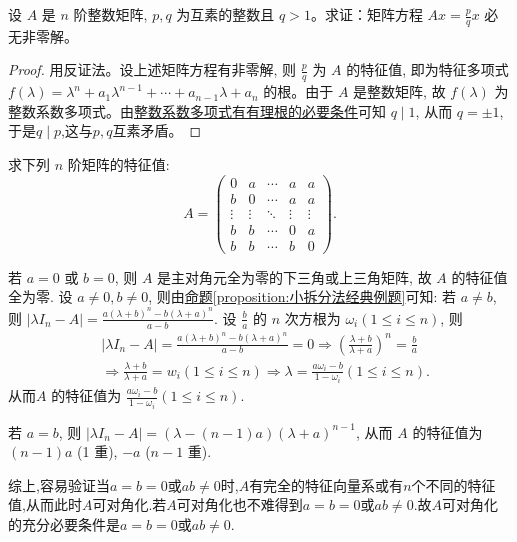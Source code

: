\documentclass[../../main.tex]{subfiles}%
\begin{document}
\begin{example}
设 $A$ 是 $n$ 阶整数矩阵, $p, q$ 为互素的整数且 $q > 1$。求证：矩阵方程 $Ax = \frac{p}{q} x$ 必无非零解。
\end{example}
\begin{proof}

用反证法。设上述矩阵方程有非零解, 则 $\frac{p}{q}$ 为 $A$ 的特征值, 即为特征多项式 $f(\lambda) = \lambda^n + a_1 \lambda^{n-1} + \cdots + a_{n-1} \lambda + a_n$ 的根。由于 $A$ 是整数矩阵, 故 $f(\lambda)$ 为整数系数多项式。由\hyperref[theorem:整数系数多项式有有理根的必要条件]{整数系数多项式有有理根的必要条件}可知 $q \mid 1$, 从而 $q = \pm 1$,于是$q\mid p$,这与$p,q$互素矛盾。

\end{proof}

\begin{example}
求下列 $n$ 阶矩阵的特征值:
\[
A = \begin{pmatrix}
0 & a & \cdots & a & a \\
b & 0 & \cdots & a & a \\
\vdots & \vdots & \ddots & \vdots & \vdots \\
b & b & \cdots & 0 & a \\
b & b & \cdots & b & 0
\end{pmatrix}.
\]
\end{example}
\begin{solution}

若 $a = 0$ 或 $b = 0$, 则 $A$ 是主对角元全为零的下三角或上三角矩阵, 故 $A$ 的特征值全为零. 设 $a \neq 0, b \neq 0$, 则由\hyperref[proposition:小拆分法经典例题]{命题\ref{proposition:小拆分法经典例题}}可知:
若 $a \neq b$, 则 $|\lambda I_n-A|=\frac{a(\lambda +b)^n-b(\lambda +a)^n}{a-b}$. 设 $\frac{b}{a}$ 的 $n$ 次方根为 $\omega_i (1 \leqslant  i \leqslant  n)$, 则
\begin{align*}
&|\lambda I_n-A|=\frac{a(\lambda +b)^n-b(\lambda +a)^n}{a-b}=0\Rightarrow \left( \frac{\lambda +b}{\lambda +a} \right) ^n=\frac{b}{a}
\\
&\Rightarrow \frac{\lambda +b}{\lambda +a}=w_i\left( 1\leqslant i\leqslant n \right) \Rightarrow \lambda =\frac{a\omega _i-b}{1-\omega _i}(1\leqslant i\leqslant n).
\end{align*}
从而$A$ 的特征值为 $\frac{a \omega_i - b}{1 - \omega_i} (1 \leqslant  i \leqslant  n)$.

若 $a = b$, 则 $|\lambda I_n - A| = (\lambda - (n - 1)a)(\lambda + a)^{n-1}$, 从而 $A$ 的特征值为 $(n - 1)a$ (1 重), $-a$ ($n - 1$ 重).

综上,容易验证当$a=b=0$或$ab\ne0$时,$A$有完全的特征向量系或有$n$个不同的特征值,从而此时$A$可对角化.若$A$可对角化也不难得到$a=b=0$或$ab\ne0$.故$A$可对角化的充分必要条件是$a=b=0$或$ab\ne0$.

\end{solution}
\end{document}
